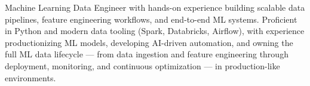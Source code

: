 
Machine Learning Data Engineer with hands-on experience building scalable data pipelines, feature engineering workflows, and end-to-end ML systems. Proficient in Python and modern data tooling (Spark, Databricks, Airflow), with experience productionizing ML models, developing AI-driven automation, and owning the full ML data lifecycle — from data ingestion and feature engineering through deployment, monitoring, and continuous optimization — in production-like environments.


